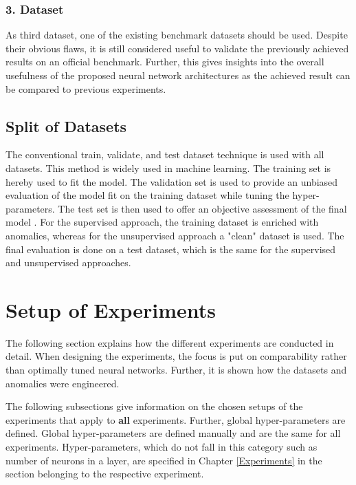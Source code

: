 \subsubsection{3. Dataset}
As third dataset, one of the existing benchmark datasets should be used. Despite their obvious flaws, it is still considered useful to validate the previously achieved results on an official benchmark. Further, this gives insights into the overall usefulness of the proposed neural network architectures as the achieved result can be compared to previous experiments.

\subsection{Split of Datasets}
The conventional train, validate, and test dataset technique is used with all datasets.
This method is widely used in machine learning. The training set is hereby used to fit the model. The validation set is used to provide an unbiased evaluation of the model fit on the training dataset while tuning the hyper-parameters. The test set is then used to offer an objective assessment of the final model \parencite{Brownlee2017}. For the supervised approach, the training dataset is enriched with anomalies, whereas for the unsupervised approach a "clean" dataset is used. The final evaluation is done on a test dataset, which is the same for the supervised and unsupervised approaches.


\section{Setup of Experiments} \label{SetupOfExperiments}
The following section explains how the different experiments are conducted in detail. When designing the experiments, the focus is put on comparability rather than optimally tuned neural networks.  Further, it is shown how the datasets and anomalies were engineered.

The following subsections give information on the chosen setups of the experiments that apply to \textbf{all} experiments. Further, global hyper-parameters are defined. Global hyper-parameters are defined manually and are the same for all experiments. Hyper-parameters, which do not fall in this category such as number of neurons in a layer, are specified in Chapter \ref{Experiments} in the section belonging to the respective experiment.

